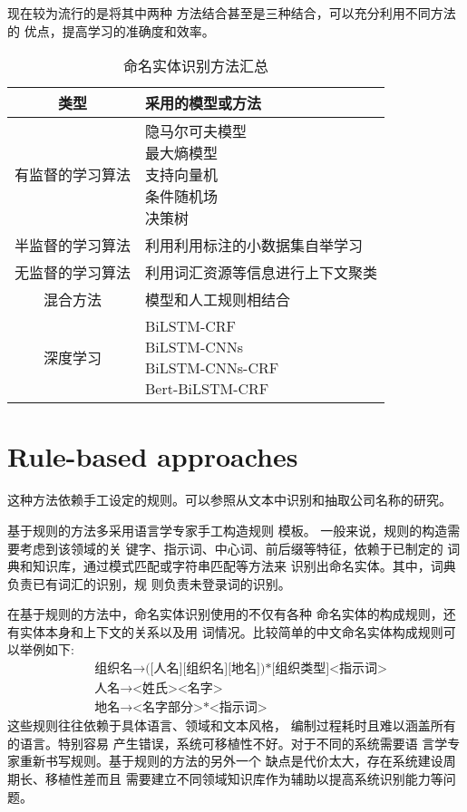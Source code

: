 \documentclass[a4paper,UTF8,no-math]{ctexart}
\begin{document}
	现在较为流行的是将其中两种
	方法结合甚至是三种结合，可以充分利用不同方法的
	优点，提高学习的准确度和效率。
	\begin{table}[htbp]
		\center
		\caption{命名实体识别方法汇总}
		\begin{tabular}{|c|l|}
		\hline
		类型 & 采用的模型或方法 \\
		\hline 
		有监督的学习算法 & \makecell[l]{隐马尔可夫模型\\最大熵模型\\支持向量机 \\条件随机场 \\决策树}\\
		
		\hline
		
		半监督的学习算法 & 利用利用标注的小数据集自举学习 \\
		\hline
		无监督的学习算法&利用词汇资源等信息进行上下文聚类\\
		\hline
		混合方法&模型和人工规则相结合 \\
		\hline
		深度学习&\makecell[l]{BiLSTM-CRF\\BiLSTM-CNNs\\BiLSTM-CNNs-CRF\\Bert-BiLSTM-CRF}\\
		\hline
		
		\end{tabular}
	\end{table}

	
	
	\section{Rule-based approaches}
	
	这种方法依赖手工设定的规则。可以参照\citep{rau1991extracting}从文本中识别和抽取公司名称的研究。
	
	基于规则的方法多采用语言学专家手工构造规则
	模板。
	一般来说，规则的构造需要考虑到该领域的关
	键字、指示词、中心词、前后缀等特征，依赖于已制定的
	词典和知识库，通过模式匹配或字符串匹配等方法来
	识别出命名实体。其中，词典负责已有词汇的识别，规
	则负责未登录词的识别。
	
	
	在基于规则的方法中，命名实体识别使用的不仅有各种
	命名实体的构成规则，还有实体本身和上下文的关系以及用
	词情况。比较简单的中文命名实体构成规则可以举例如下:
\begin{align*}
& \text{组织名} \to  \text{([人名][组织名][地名])*[组织类型]<指示词>}\\
& \text{人名} \to  \text{<姓氏><名字>}\\
& \text{地名} \to  \text{<名字部分>*<指示词>}
\end{align*}
	这些规则往往依赖于具体语言、领域和文本风格，
	编制过程耗时且难以涵盖所有的语言。特别容易
	产生错误，系统可移植性不好。对于不同的系统需要语
	言学专家重新书写规则。基于规则的方法的另外一个
	缺点是代价太大，存在系统建设周期长、移植性差而且
	需要建立不同领域知识库作为辅助以提高系统识别能力等问题。
	
\end{document}

